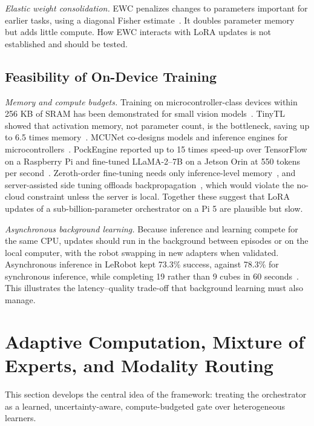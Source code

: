 \documentclass[journal]{IEEEtran}
\begin{document}
\textit{Elastic weight consolidation.} EWC penalizes changes to parameters important for earlier tasks, using a diagonal Fisher estimate~\cite{Kirkpatrick2017}. It doubles parameter memory but adds little compute. How EWC interacts with LoRA updates is not established and should be tested.


\subsection{Feasibility of On-Device Training}\label{sec:feasibility}
\textit{Memory and compute budgets.} Training on microcontroller-class devices within 256 KB of SRAM has been demonstrated for small vision models~\cite{Lin2022}. TinyTL showed that activation memory, not parameter count, is the bottleneck, saving up to 6.5 times memory~\cite{Cai2020}. MCUNet co-designs models and inference engines for microcontrollers~\cite{Lin2020}. PockEngine reported up to 15 times speed-up over TensorFlow on a Raspberry Pi and fine-tuned LLaMA-2--7B on a Jetson Orin at 550 tokens per second~\cite{Zhu2023}. Zeroth-order fine-tuning needs only inference-level memory~\cite{Malladi2023}, and server-assisted side tuning offloads backpropagation~\cite{Li2025}, which would violate the no-cloud constraint unless the server is local. Together these suggest that LoRA updates of a sub-billion-parameter orchestrator on a Pi 5 are plausible but slow.

\textit{Asynchronous background learning.} Because inference and learning compete for the same CPU, updates should run in the background between episodes or on the local computer, with the robot swapping in new adapters when validated. Asynchronous inference in LeRobot kept 73.3\% success, against 78.3\% for synchronous inference, while completing 19 rather than 9 cubes in 60 seconds~\cite{Cadene2026}. This illustrates the latency--quality trade-off that background learning must also manage.


\section{Adaptive Computation, Mixture of Experts, and Modality Routing}\label{sec:routing}
This section develops the central idea of the framework: treating the orchestrator as a learned, uncertainty-aware, compute-budgeted gate over heterogeneous learners.
\end{document}
